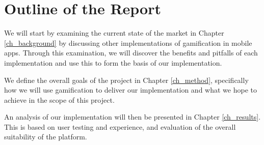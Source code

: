 \section{Outline of the Report}

We will start by examining the current state of the market in Chapter
\ref{ch_background} by
discussing other implementations of gamification in mobile
apps. Through this examination, we will discover the benefits and
pitfalls of each implementation and use this to form the basis of our
implementation. 

We define the overall goals of the project in Chapter \ref{ch_method},
specifically how we will use gamification to deliver our
implementation and what we hope to achieve in the scope of this
project.

An analysis of our implementation will then be presented in Chapter
\ref{ch_results}. This is based on user testing and experience, and evaluation of the
overall suitability of the platform.
